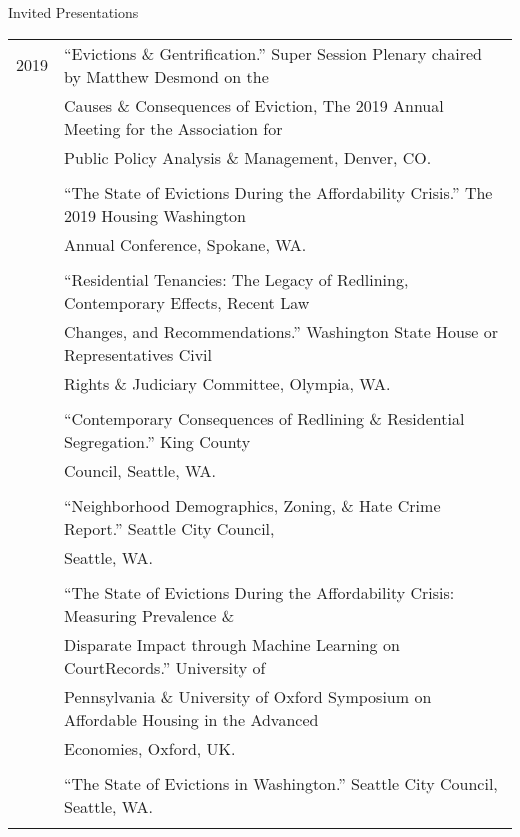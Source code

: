 \documentclass{resume} %
\begin{document}
\begin{rSection}{Invited Presentations}
\vspace{5mm}
\begin{tabular}{ @{} >{}l @{\hspace{6ex}} l }

2019	&``Evictions \& Gentrification.'' Super Session Plenary chaired by Matthew Desmond on the\\
		& Causes \& Consequences of Eviction, The 2019 Annual Meeting for the Association for\\
		& Public Policy Analysis \& Management, Denver, CO.\\\\

		&``The State of Evictions During the Affordability Crisis.'' The 2019 Housing Washington\\
		&Annual Conference, Spokane, WA.\\\\

		&``Residential Tenancies: The Legacy of Redlining, Contemporary Effects, Recent Law\\
		&Changes, and Recommendations.'' Washington State House or Representatives Civil\\
		&Rights \& Judiciary Committee, Olympia, WA.\\\\

		&``Contemporary Consequences of Redlining \& Residential Segregation.'' King County\\
		& Council, Seattle, WA.\\\\

		&``Neighborhood Demographics, Zoning, \& Hate Crime Report.'' Seattle City Council,\\
		&Seattle, WA.\\\\

		&``The State of Evictions During the Affordability Crisis: Measuring Prevalence \&\\
		&Disparate Impact through Machine Learning on CourtRecords.'' University of\\
		& Pennsylvania \& University of Oxford Symposium on Affordable Housing in the Advanced\\
		& Economies, Oxford, UK.\\\\

		&``The State of Evictions in Washington.'' Seattle City Council, Seattle, WA.\\\\


\end{tabular}
\end{rSection}
\end{document}
